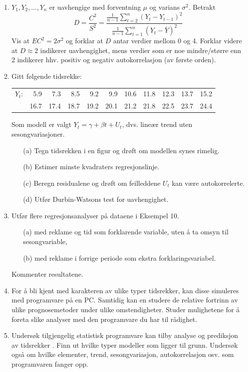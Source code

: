 \begin{enumerate}
\item $Y_1, Y_2, \ldots, Y_n$ er uavhengige med forventning $\mu$
og varians $\sigma^2$. Betrakt
\[ D=\frac{C^2}{S^2}=\frac{ \frac{1}{n-1}\sum_{t=2}^n {(Y_t-Y_{t-1})}^2}
                       { \frac{1}{n-1}\sum_{t=1}^n {(Y_t-\bar{Y})}^2}  \]
Vis at $EC^2 =2 {\sigma}^2$ og forklar at $D$ antar verdier mellom 0 og 4.
Forklar videre at $D\approx 2$ indikerer uavhengighet, mens verdier som er noe
mindre/større enn 2 indikerer hhv. positiv  og negativ autokorrelasjon
(av første orden). 

\item
Gitt følgende tidsrekke: 
\begin{center}
\begin{tabular}{rrrrrrrrrrr}
$Y_t$: & 5.9  &  7.3 &  8.5 &  9.2 &  9.9 & 10.6 & 11.8 & 12.3 & 13.7 & 15.2 \\
     &16.7  & 17.4 & 18.7 & 19.2 & 20.1 & 21.2 & 21.8 & 22.5 & 23.7 & 24.4
\end{tabular}
\end{center}
Som modell er valgt $Y_t = \gamma +{\beta}t + U_t$, dvs. lineær trend 
uten sesongvariasjoner.

\begin{itemize}
\item[(a)] Tegn tidsrekken i en figur og drøft om modellen synes rimelig.
\item[(b)] Estimer minste kvadraters regresjonslinje.
\item[(c)] Beregn residualene og drøft om feilleddene $U_t$ kan være
autokorrelerte.
\item[(d)] Utfør Durbin-Watsons test for uavhengighet.
\end{itemize}

\item Utfør flere regresjonsanalyser på dataene i Eksempel 10.
     \begin{itemize}
     \item[(a)] med reklame og tid som forklarende variable, 
              uten å ta omsyn til sesongvariable,
     \item[(b)] med reklame i forrige periode som ekstra forklaringsvariabel.
     \end{itemize}
      Kommenter resultatene. 

\item For å bli kjent med karakteren av ulike typer tidsrekker,
kan disse simuleres med programvare på en PC.  Samtidig kan en studere de 
relative fortrinn av ulike prognosemetoder under ulike omstendigheter.
Studer mulighetene for å foreta slike analyser med den programvare
du har til rådighet.

\item Undersøk tilgjengelig statistisk programvare kan tilby analyse og
      prediksjon av tidsrekker . Finn ut hvilke typer modeller
      som ligger til grunn.
      Undersøk også om hvilke elementer, trend, sesongvariasjon, 
      autokorrelasjon osv. som programvaren fanger opp.
 
\end{enumerate}
\normalsize

